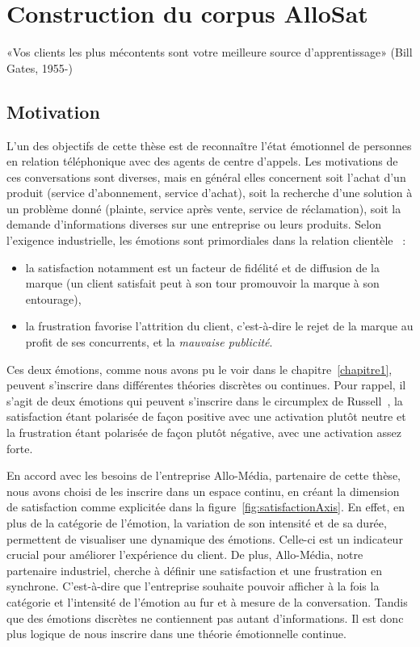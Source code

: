 \chapter{Construction du corpus AlloSat}
\label{chapitre4}
«Vos clients les plus mécontents sont votre meilleure source d’apprentissage»  (Bill Gates, 1955-)

\section{Motivation}
L'un des objectifs de cette thèse est de reconnaître l'état émotionnel de personnes en relation téléphonique avec des agents de centre d'appels. Les motivations de ces conversations sont diverses, mais en général elles concernent soit l'achat d'un produit (service d'abonnement, service d'achat), soit la recherche d'une solution à un problème donné (plainte, service après vente, service de réclamation), soit la demande d'informations diverses sur une entreprise ou leurs produits. Selon l'exigence industrielle, les émotions sont primordiales dans la relation clientèle~\cite{Tumbat2011} :
\begin{itemize}
  \item la satisfaction notamment est un facteur de fidélité et de diffusion de la marque (un client satisfait peut à son tour promouvoir la marque à son entourage),
  \item la frustration favorise l'attrition du client, c'est-à-dire le rejet de la marque au profit de ses concurrents, et la \textit{mauvaise publicité}.
\end{itemize}
Ces deux émotions, comme nous avons pu le voir dans le chapitre~\ref{chapitre1}, peuvent s'inscrire dans différentes théories discrètes ou continues. Pour rappel, il s'agit de deux émotions qui peuvent s'inscrire dans le circumplex de Russell~\cite{Russell1980}, la satisfaction étant polarisée de façon positive avec une activation plutôt neutre et la frustration étant polarisée de façon plutôt négative, avec une activation assez forte.

En accord avec les besoins de l'entreprise Allo-Média, partenaire de cette thèse, nous avons choisi de les inscrire dans un espace continu, en créant la dimension de satisfaction comme explicitée dans la figure~\ref{fig:satisfactionAxis}. En effet, en plus de la catégorie de l'émotion, la variation de son intensité et de sa durée, permettent de visualiser une dynamique des émotions. Celle-ci est un indicateur crucial pour améliorer l'expérience du client. De plus, Allo-Média, notre partenaire industriel, cherche à définir une satisfaction et une frustration en synchrone. C'est-à-dire que l'entreprise souhaite pouvoir afficher à la fois la catégorie et l'intensité de l'émotion au fur et à mesure de la conversation. Tandis que des émotions discrètes ne contiennent pas autant d'informations. Il est donc plus logique de nous inscrire dans une théorie émotionnelle continue.

